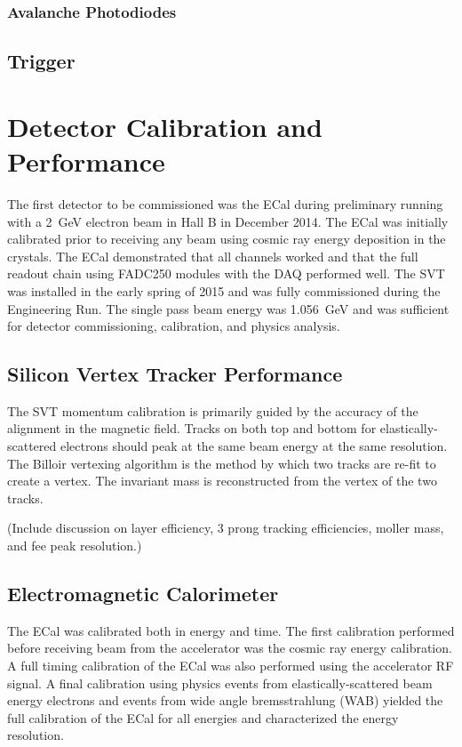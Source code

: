 \documentclass[12pt]{report}
\begin{document}
\subsection{Avalanche Photodiodes}


\section{Trigger}


\chapter{Detector Calibration and Performance} 
The first detector to be commissioned was the ECal during preliminary running with a 2~GeV electron beam in Hall B in December 2014. The ECal was initially calibrated prior to receiving any beam using cosmic ray energy deposition in the crystals. The ECal demonstrated that all channels worked and that the full readout chain using FADC250 modules with the DAQ performed well. The SVT was installed in the early spring of 2015 and was fully commissioned during the Engineering Run. The single pass beam energy was 1.056~GeV and was sufficient for detector commissioning, calibration, and physics analysis. 

\section{Silicon Vertex Tracker Performance}
The SVT momentum calibration is primarily guided by the accuracy of the alignment in the magnetic field. Tracks on both top and bottom for elastically-scattered electrons should peak at the same beam energy at the same resolution. The Billoir vertexing algorithm is the method by which two tracks are re-fit to create a vertex. The invariant mass is reconstructed from the vertex of the two tracks. 

%

(Include discussion on layer efficiency, 3 prong tracking efficiencies, moller mass, and fee peak resolution.)

\section{Electromagnetic Calorimeter}
The ECal was calibrated both in energy and time. The first calibration performed before receiving beam from the accelerator was the cosmic ray energy calibration. A full timing calibration of the ECal was also performed using the accelerator RF signal. A final calibration using physics events from elastically-scattered beam energy electrons and events from wide angle bremsstrahlung (WAB) yielded the full calibration of the ECal for all energies and characterized the energy resolution. 
\end{document}
